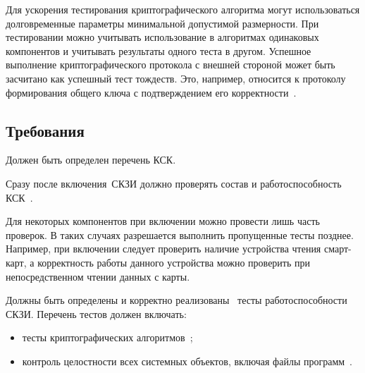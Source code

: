 Для ускорения тестирования криптографического алгоритма
могут использоваться долговременные параметры минимальной допустимой 
размерности. При тестировании можно учитывать 
использование в алгоритмах одинаковых компонентов и учитывать результаты
одного теста в другом. Успешное выполнение 
криптографического протокола с внешней стороной может быть засчитано
как успешный тест тождеств. Это, например, относится к протоколу 
формирования общего ключа с подтверждением его корректности~.


\subsection{Требования}\label{ST.Reqs}

\label{R.ST.CSCList} %
Должен быть определен перечень КСК.


\label{R.ST.CSCTests} %
Сразу после включения~СКЗИ должно проверять состав 
и работоспособность КСК~.

\begin{note*}
Для некоторых компонентов при включении можно провести лишь часть 
проверок. В таких случаях разрешается выполнить пропущенные тесты позднее. 
Например, при включении следует проверить наличие устройства чтения 
смарт-карт, а корректность работы данного устройства можно проверить при 
непосредственном чтении данных с карты. 
\end{note*}

\label{R.ST.Tests} %
Должны быть определены и корректно 
реализованы~
тесты работоспособности СКЗИ.
Перечень тестов должен включать:
\begin{itemize}
\item
тесты криптографических алгоритмов~;
\item
контроль целостности всех системных объектов, включая файлы 
программ~.
\end{itemize}

